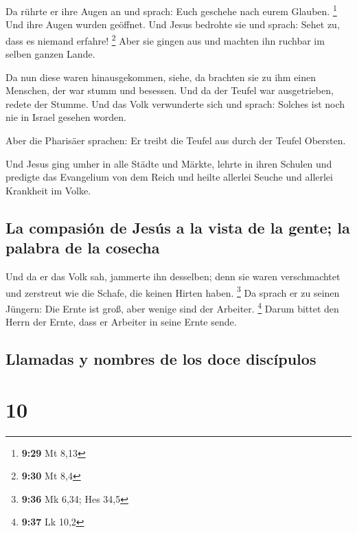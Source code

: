 Da rührte er ihre Augen an und sprach: Euch geschehe
nach eurem Glauben. \footnote{\textbf{9:29} Mt 8,13}  Und
ihre Augen wurden geöffnet. Und Jesus bedrohte sie und sprach: Sehet zu,
dass es niemand erfahre! \footnote{\textbf{9:30} Mt 8,4} 
Aber sie gingen aus und machten ihn ruchbar im selben ganzen Lande.

 Da nun diese waren hinausgekommen, siehe, da brachten
sie zu ihm einen Menschen, der war stumm und besessen. 
Und da der Teufel war ausgetrieben, redete der Stumme. Und das Volk
verwunderte sich und sprach: Solches ist noch nie in Israel gesehen
worden.

 Aber die Pharisäer sprachen: Er treibt die Teufel aus
durch der Teufel Obersten.

 Und Jesus ging umher in alle Städte und Märkte, lehrte
in ihren Schulen und predigte das Evangelium von dem Reich und heilte
allerlei Seuche und allerlei Krankheit im Volke.

\hypertarget{la-compasiuxf3n-de-jesuxfas-a-la-vista-de-la-gente-la-palabra-de-la-cosecha}{%
\subsection{La compasión de Jesús a la vista de la gente; la palabra de
la
cosecha}\label{la-compasiuxf3n-de-jesuxfas-a-la-vista-de-la-gente-la-palabra-de-la-cosecha}}

 Und da er das Volk sah, jammerte ihn desselben; denn sie
waren verschmachtet und zerstreut wie die Schafe, die keinen Hirten
haben. \footnote{\textbf{9:36} Mk 6,34; Hes 34,5}  Da
sprach er zu seinen Jüngern: Die Ernte ist groß, aber wenige sind der
Arbeiter. \footnote{\textbf{9:37} Lk 10,2}  Darum bittet
den Herrn der Ernte, dass er Arbeiter in seine Ernte sende.

\hypertarget{llamadas-y-nombres-de-los-doce-discuxedpulos}{%
\subsection{Llamadas y nombres de los doce
discípulos}\label{llamadas-y-nombres-de-los-doce-discuxedpulos}}

\hypertarget{section-9}{%
\section{10}\label{section-9}}


